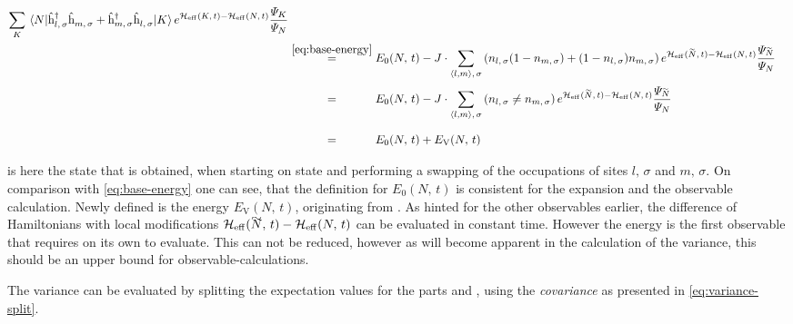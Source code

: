 \begin{equation}
\begin{split}
        \lsum[K] \bracketHelper{N}{ \withspinhcop{l}{\sigma}{\dagger} \withspinhcop{m}{\sigma}{} + \withspinhcop{m}{\sigma}{\dagger} \withspinhcop{l}{\sigma}{} }{K} e^{\HeffOft[K]-\HeffOft[N]}
        \frac{
            \psiN[K]
        }{
            \psiN[N]
        }\\
        &\stackrel{\ref{eq:base-energy}}{=} E_0(N,\,t)-
        J \cdot \neighborsumWSpin{l}{m}{\sigma}
        \left(n_{l,\,\sigma} (1- n_{m,\,\sigma}) + (1-n_{l,\,\sigma}) n_{m,\,\sigma}\right)
         e^{\HeffOft[\vphantom{N}\smash{\tilde{N}}]-\HeffOft[N]}
        \frac{
            \psiN[\vphantom{N}\smash{\tilde{N}}]
        }{
            \psiN[N]
        }\\
        &\stackrel{\phantom{\ref{eq:base-energy}}}{=} E_0(N,\,t)-
        J \cdot \neighborsumWSpin{l}{m}{\sigma}
        \left(n_{l,\,\sigma} \neq n_{m,\,\sigma}\right)
         e^{\HeffOft[\vphantom{N}\smash{\tilde{N}}]-\HeffOft[N]}
        \frac{
            \psiN[\vphantom{N}\smash{\tilde{N}}]
        }{
            \psiN[N]
        }\\
        &\stackrel{\phantom{\ref{eq:base-energy}}}{=} E_0(N,\,t) + E_\text{V}(N,\,t)
    \end{split}
\end{equation}

 is here the state that is obtained, when starting on state \ketN and performing a swapping of the occupations of sites $l,\,\sigma$ and $m,\,\sigma$.
On comparison with \autoref{eq:base-energy} one can see, that the definition for $E_0(N,\,t)$ is consistent for the expansion and the observable calculation.
Newly defined is the energy $E_\text{V}(N,\,t)$, originating from \Vhamiltonian[].
As hinted for the other observables earlier, the difference of Hamiltonians with local modifications $\HeffOft[\vphantom{N}\smash{\tilde{N}}]-\HeffOft[N]$ can be evaluated in constant time.
However the energy is the first observable that requires  on its own to evaluate. This can not be reduced, however as will become apparent in the calculation of the variance, this should be an upper bound for observable-calculations.

The variance can be evaluated by splitting the expectation values for the parts \HzeroHamiltonian[\schroedingerPicture] and \Vhamiltonian[\schroedingerPicture], using the \emph{covariance} as presented in \autoref{eq:variance-split}.

